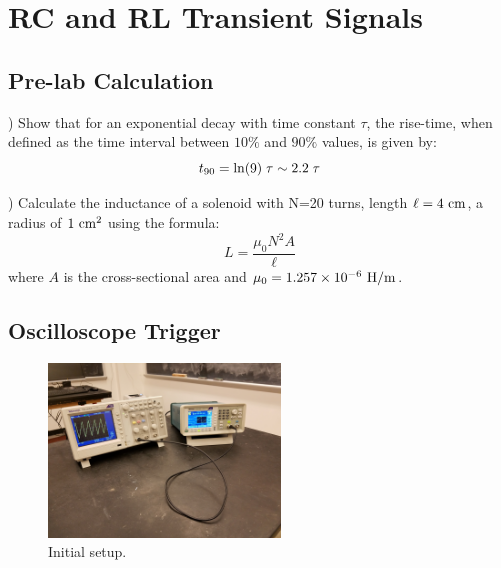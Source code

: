 \chapter{RC and RL Transient Signals}

\section{Pre-lab Calculation}

) Show that for an exponential decay with time constant $\tau$, the rise-time, when defined as the time interval between $10\%$ and $90\%$ values, is given by:
\begin{displaymath}
t_{90} = {\rm ln}(9) \; \tau \sim 2.2 \; \tau
\end{displaymath}

) Calculate the inductance of a solenoid with N=20 turns, length $\ell=4~\rm cm$, a radius of $1~\rm cm^2$ using the formula:
\begin{displaymath}
L = \frac{\mu_0 N^2 A}{\ell}
\end{displaymath}
where $A$ is the cross-sectional area and $\mu_0 = 1.257 \times 10^{-6}~\rm H/m$.

\section{Oscilloscope Trigger}

\begin{figure}[htbp]
\begin{center}
\includegraphics[width=0.55\textwidth]{figs/labs/transients/ramp_setup.jpg} 
\caption{Initial setup.}
\label{fig:ramp_setup}
\end{center}
\end{figure}

